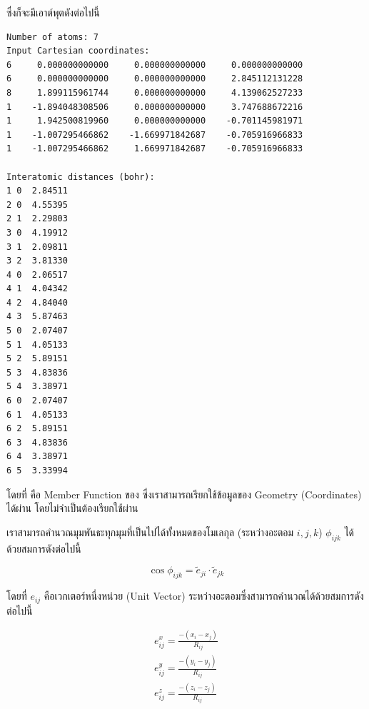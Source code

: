 \vspace{5pt}

\noindent ซึ่งก็จะมีเอาต์พุตดังต่อไปนี้

\vspace{5pt}

\begin{lstlisting}[style=MyC++]
Number of atoms: 7
Input Cartesian coordinates:
6     0.000000000000     0.000000000000     0.000000000000
6     0.000000000000     0.000000000000     2.845112131228
8     1.899115961744     0.000000000000     4.139062527233
1    -1.894048308506     0.000000000000     3.747688672216
1     1.942500819960     0.000000000000    -0.701145981971
1    -1.007295466862    -1.669971842687    -0.705916966833
1    -1.007295466862     1.669971842687    -0.705916966833

Interatomic distances (bohr):
1 0  2.84511
2 0  4.55395
2 1  2.29803
3 0  4.19912
3 1  2.09811
3 2  3.81330
4 0  2.06517
4 1  4.04342
4 2  4.84040
4 3  5.87463
5 0  2.07407
5 1  4.05133
5 2  5.89151
5 3  4.83836
5 4  3.38971
6 0  2.07407
6 1  4.05133
6 2  5.89151
6 3  4.83836
6 4  3.38971
6 5  3.33994
\end{lstlisting}

\vspace{5pt}

\noindent โดยที่  คือ Member Function ของ  ซึ่งเราสามารถเรียกใช้ข้อมูลของ Geometry (Coordinates)
ได้ผ่าน  โดยไม่จำเป็นต้องเรียกใช้ผ่าน 

\noindent {}

เราสามารถคำนวณมุมพันธะทุกมุมที่เป็นไปได้ทั้งหมดของโมเลกุล (ระหว่างอะตอม $i, j, k$) $\phi_{ijk}$ ได้ด้วยสมการดังต่อไปนี้

\begin{equation}
  \label{eq:cos_bond_angle}
  \cos \phi_{ijk} = \tilde{e}_{ji} \cdot \tilde{e}_{jk}
\end{equation}

\noindent โดยที่ $e_{ij}$ คือเวกเตอร์หนึ่งหน่วย (Unit Vector) ระหว่างอะตอมซึ่งสามารถคำนวณได้ด้วยสมการดังต่อไปนี้

\begin{align*}
  e^{x}_{ij}
  = \frac{
    -(x_{i} - x_{j})
  }
  {
    R_{ij}
  } \\
  e^{y}_{ij}
  = \frac{
    -(y_{i} - y_{j})
  }
  {
    R_{ij}
  } \\
  e^{z}_{ij}
  = \frac{
    -(z_{i} - z_{j})
  }
  {
    R_{ij}
  }
\end{align*}

